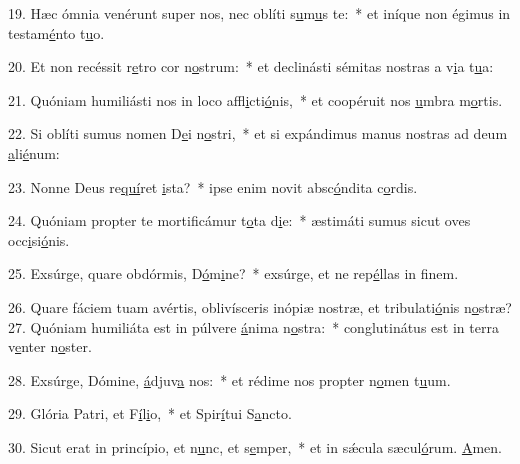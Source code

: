 19. Hæc ómnia venérunt super nos, nec oblíti s\uline{u}m\uline{u}s te:~* et iníque non égimus in testam\uline{é}nto t\uline{u}o.\par 
20. Et non recéssit r\uline{e}tro cor n\uline{o}strum:~* et declinásti sémitas nostras a v\uline{i}a t\uline{u}a:\par 
21. Quóniam humiliásti nos in loco affl\uline{i}cti\uline{ó}nis,~* et coopéruit nos \uline{u}mbra m\uline{o}rtis.\par 
22. Si oblíti sumus nomen D\uline{e}i n\uline{o}stri,~* et si expándimus manus nostras ad deum \uline{a}li\uline{é}num:\par 
23. Nonne Deus re\uline{quí}ret \uline{i}sta?~* ipse enim novit absc\uline{ó}ndita c\uline{o}rdis.\par 
24. Quóniam propter te mortificámur t\uline{o}ta d\uline{i}e:~* æstimáti sumus sicut oves occ\uline{i}si\uline{ó}nis.\par 
25. Exsúrge, quare obdórmis, D\uline{ó}m\uline{i}ne?~* exsúrge, et ne rep\uline{é}llas in f\uline{i}nem.\par 
26. Quare fáciem tuam avértis, oblivísceris inópiæ nostræ, et tribulati\uline{ó}nis n\uline{o}stræ?
27. Quóniam humiliáta est in púlvere \uline{á}nima n\uline{o}stra:~* conglutinátus est in terra v\uline{e}nter n\uline{o}ster.\par 
28. Exsúrge, Dómine, \uline{á}djuv\uline{a} nos:~* et rédime nos propter n\uline{o}men t\uline{u}um.\par 
29. Glória Patri, et F\uline{í}l\uline{i}o,~* et Spir\uline{í}tui S\uline{a}ncto.\par 
30. Sicut erat in princípio, et n\uline{u}nc, et s\uline{e}mper,~* et in sǽcula sæcul\uline{ó}rum. \uline{A}men.\par 
